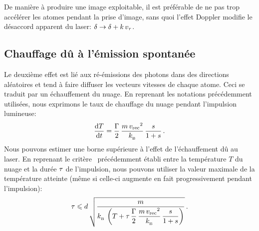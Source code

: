 \noindent De manière à produire une image exploitable, il est préférable de ne pas trop accélérer les atomes pendant la prise d'image, sans quoi l'effet Doppler modifie le désaccord apparent du laser: ${\delta} \rightarrow {\delta} + k\,v_{\tau}$.


\subsection{Chauffage dû à l'émission spontanée}
Le deuxième effet est lié aux ré-émissions des photons dans des directions aléatoires et tend à faire diffuser les vecteurs vitesses de chaque atome. Ceci se traduit par un échauffement du nuage. En reprenant les notations précédemment utilisées, nous exprimons le taux de chauffage du nuage pendant l'impulsion lumineuse:
\[
{\frac{\mathrm{d} T}{\mathrm{d} t}} = \frac{{\Gamma}}{2}\,\frac{m\,{v_{\rm rec}}^2}{{k_{_{\rm B}}}} \, \frac{{s}}{1+{s}}
\, .
\]
\EnFaitNon%
{
Nous pouvons estimer une borne supérieure à l'effet de l'échauffement dû au laser. 
En reprenant le critère~ précédemment établi entre la température $T$ du nuage et la durée ${\tau}$ de l'impulsion, nous pouvons utiliser la valeur maximale de la température atteinte (même si celle-ci augmente en fait progressivement pendant l'impulsion):
\begin{equation}
\TPulse \leqslant d\,\sqrt{\frac{m}{\kb\,
\left( T 
+ \TPulse\,\dfrac{\pulsSpont}{2}\,\dfrac{m\,\vrecul^2}{\kb} \, \dfrac{\sat}{1+\sat}
\right)}} 
\pointformule
	\label{eq:tauTempEchauf}
\end{equation}
}


